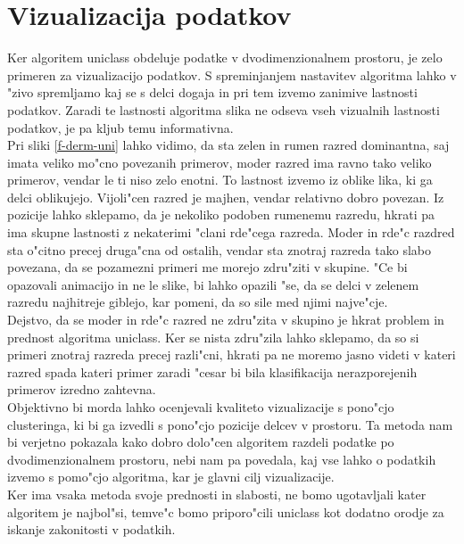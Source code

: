 \documentclass[a4paper]{article}
\begin{document}
\section{Vizualizacija podatkov}
	Ker algoritem uniclass obdeluje podatke v dvodimenzionalnem prostoru, je zelo primeren za vizualizacijo podatkov. S spreminjanjem nastavitev algoritma lahko v "zivo spremljamo kaj se s delci dogaja in pri tem izvemo zanimive lastnosti podatkov. Zaradi te lastnosti algoritma slika ne odseva vseh vizualnih lastnosti podatkov, je pa kljub temu informativna. \\
	Pri sliki \ref{f-derm-uni} lahko vidimo, da sta zelen in rumen razred dominantna, saj imata veliko mo"cno povezanih primerov, moder razred ima ravno tako veliko primerov, vendar le ti niso zelo enotni. To lastnost izvemo iz oblike lika, ki ga delci oblikujejo. Vijoli"cen razred je majhen, vendar relativno dobro povezan. Iz pozicije lahko sklepamo, da je nekoliko podoben rumenemu razredu, hkrati pa ima skupne lastnosti z nekaterimi "clani rde"cega razreda. Moder in rde"c razdred sta o"citno precej druga"cna od ostalih, vendar sta znotraj razreda tako slabo povezana, da se pozamezni primeri me morejo zdru"ziti v skupine. "Ce bi opazovali animacijo in ne le slike, bi lahko opazili "se, da se delci v zelenem razredu najhitreje giblejo, kar pomeni, da so sile med njimi najve"cje.\\
	Dejstvo, da se moder in rde"c razred ne zdru"zita v skupino je hkrat problem in prednost algoritma uniclass. Ker se nista zdru"zila lahko sklepamo, da so si primeri znotraj razreda precej razli"cni, hkrati pa ne moremo jasno videti v kateri razred spada kateri primer zaradi "cesar bi bila klasifikacija nerazporejenih primerov izredno zahtevna.\\
	Objektivno bi morda lahko ocenjevali kvaliteto vizualizacije s pono"cjo clusteringa, ki bi ga izvedli s pono"cjo pozicije delcev v prostoru. Ta metoda nam bi verjetno pokazala kako dobro dolo"cen algoritem razdeli podatke po dvodimenzionalnem prostoru, nebi nam pa povedala, kaj vse lahko o podatkih izvemo s pomo"cjo algoritma, kar je glavni cilj vizualizacije.\\
	Ker ima vsaka metoda svoje prednosti in slabosti, ne bomo ugotavljali kater algoritem je najbol"si, temve"c bomo priporo"cili uniclass kot dodatno orodje za iskanje zakonitosti v podatkih.
	
\end{document}

